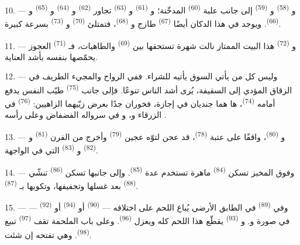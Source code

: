 \VUsaut{4.0mm}
\VUsaut{3.0mm}

10. --- و \textsuperscript{(58)} و \textsuperscript{(59)}
إلى جانب علبة  \textsuperscript{(60)} المدخّنة؛
و \textsuperscript{(61)} و \textsuperscript{(63)}
تجاور  \textsuperscript{(62)} و \textsuperscript{(64)}
و \textsuperscript{(65)} و \textsuperscript{(66)}.
ويوجد في هذا الدكان أيضًا  \textsuperscript{(67)} طازج
و \textsuperscript{(68)}، فتمتلئ  \textsuperscript{(70)}
و \textsuperscript{(73)} بسرعة كبيرة.

11. --- و \textsuperscript{(72)} هذا البيت الممتاز نالت شهرة تستحقها
بين  \textsuperscript{(69)} والطاهيات، فـ
\textsuperscript{(71)} العجوز يحمّصها بنفسه بأشد العناية.

\VUsaut{4.0mm}
\VUsaut{3.0mm}

12. --- وليس كل من يأتي السوق يأتيه للشراء. ففي الرواح والمجيء الطريف في
الزقاق المؤدي إلى السقيفة، يُرى أشد الناس تنوعًا. فإلى جانب  \textsuperscript{(75)} طيّب النفس يدفع أمامه  \textsuperscript{(74)}،
ها هما جنديان في إجازة، فخوران جدًا بعرض زيّيهما الزاهيين:
 \textsuperscript{(76)} في  الزرقاء و، و في سرواله الفضفاض وعلى رأسه
.

13. --- و \textsuperscript{(80)}، واقفًا على عتبة 
\textsuperscript{(78)}، قد عجن لتوّه عجين  \textsuperscript{(79)} وأخرج
من الفرن  \textsuperscript{(81)} و
\textsuperscript{(82)} و \textsuperscript{(83)} التي في
الواجهة.

14. --- وفوق المخبز تسكن  \textsuperscript{(84)} ماهرة تستخدم عدة
 \textsuperscript{(85)}. وإلى جانبها تسكن 
\textsuperscript{(86)} تنشّي  \textsuperscript{(88)} بعد غسلها
وتجفيفها، وتكويها بـ \textsuperscript{(87)}.

\VUsaut{4.0mm}
\VUsaut{3.0mm}

15. --- وفي  \textsuperscript{(89)} في الطابق الأرضي يُباع اللحم
على اختلافه ---  \textsuperscript{(90)} أو  \textsuperscript{(94)}
أو  \textsuperscript{(92)} --- في صورة 
و. و \textsuperscript{(93)} يقطّع هذا اللحم كله
ويعزل  \textsuperscript{(96)}. وعلى باب الملحمة تقف
 \textsuperscript{(97)} تبيع  \textsuperscript{(98)}.
وهي تفتحه إن شئت.

